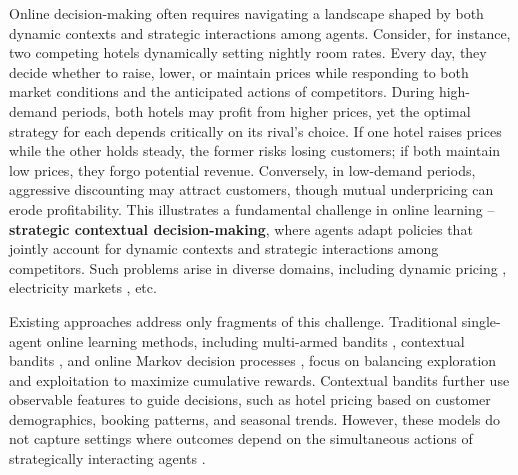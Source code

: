 \documentclass[12pt]{article}
\begin{document}
Online decision-making often requires navigating a landscape shaped by both dynamic contexts and strategic interactions among agents. Consider, for instance, two competing hotels dynamically setting nightly room rates. Every day, they decide whether to raise, lower, or maintain prices while responding to both market conditions and the anticipated actions of competitors.  During high-demand periods, both hotels may profit from higher prices, yet the optimal strategy for each depends critically on its rival’s choice. If one hotel raises prices while the other holds steady, the former risks losing customers; if both maintain low prices, they forgo potential revenue. 
Conversely, in low-demand periods, aggressive discounting may attract customers, though mutual underpricing can erode profitability. 
This illustrates a fundamental challenge in online learning -- \textbf{strategic contextual decision-making}, where agents adapt policies that jointly account for dynamic contexts and strategic interactions among competitors. Such problems arise in diverse domains, including dynamic pricing \citep{BesbesZeevi2009}, electricity markets \citep{KakadeEtAl2013}, etc.
 
Existing approaches address only fragments of this challenge. Traditional single-agent online learning methods, including multi-armed bandits \citep{auer2002finite}, contextual bandits \citep{langford2007epoch}, and online Markov decision processes \citep{neu2010online}, focus on balancing exploration and exploitation to maximize cumulative rewards. Contextual bandits further use observable features to guide decisions, such as hotel pricing based on customer demographics, booking patterns, and seasonal trends. However, these models do not capture settings where outcomes depend on the simultaneous actions of strategically interacting agents \citep{maiti2023instance}.
\end{document}
